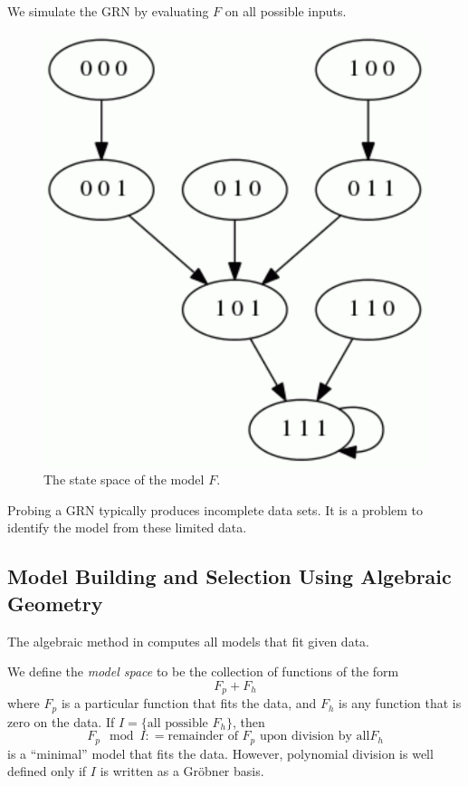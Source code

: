 \documentclass{amsart}
\theoremstyle{definition}
\theoremstyle{remark}
\theoremstyle{example}
\theoremstyle{conjecture}
\numberwithin{equation}{section}
\begin{document}
We simulate the GRN by evaluating $F$ on all possible inputs.
\begin{figure}
  \centering
	 \includegraphics[scale=0.3]{state-space.pdf}
  \caption{The state space of the model $F$.}\label{}
\end{figure}


Probing a GRN typically produces incomplete data sets. It is a
problem to identify the model from these limited data.

\subsection{Model Building and Selection Using Algebraic Geometry}

The algebraic method in \cite{jarrah} computes all models that fit
given data.

We define the \textit{model space} to be the collection of functions
of the form $$F_p + F_h$$ where $F_p$ is a particular function that
fits the data, and $F_h$ is any     function that is zero on the
data. If $I = \{\text{all possible }F_h \}$, then
%
$$F_p \mod I : = \text{remainder of }F_p\text{ upon division by all
}F_h$$
%
is a ``minimal'' model that fits the data. However, polynomial
division is well defined only if $I$ is written as a Gr\"obner
basis.
\end{document}
